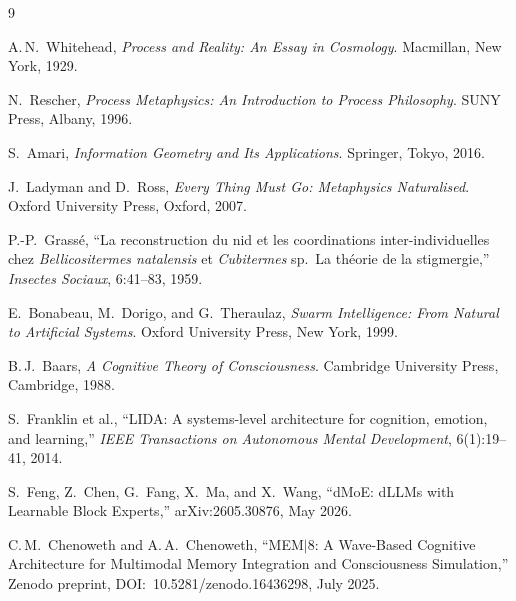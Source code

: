 \documentclass[12pt, a4paper, twoside]{article}
\theoremstyle{plain}
\theoremstyle{definition}
\theoremstyle{remark}
\begin{document}
\newpage
\begin{thebibliography}{9}

A.\,N.\ Whitehead, \emph{Process and Reality: An Essay in Cosmology}.
Macmillan, New York, 1929.

N.\ Rescher, \emph{Process Metaphysics: An Introduction to Process Philosophy}.
SUNY Press, Albany, 1996.

S.\ Amari, \emph{Information Geometry and Its Applications}.
Springer, Tokyo, 2016.

J.\ Ladyman and D.\ Ross, \emph{Every Thing Must Go: Metaphysics Naturalised}.
Oxford University Press, Oxford, 2007.

P.-P.\ Grass\'{e}, ``La reconstruction du nid et les coordinations
inter-individuelles chez \emph{Bellicositermes natalensis} et \emph{Cubitermes}
sp.\ La th\'{e}orie de la stigmergie,'' \emph{Insectes Sociaux}, 6:41--83, 1959.

E.\ Bonabeau, M.\ Dorigo, and G.\ Theraulaz, \emph{Swarm Intelligence: From
Natural to Artificial Systems}. Oxford University Press, New York, 1999.

B.\,J.\ Baars, \emph{A Cognitive Theory of Consciousness}.
Cambridge University Press, Cambridge, 1988.

S.\ Franklin et al., ``LIDA: A systems-level architecture for cognition,
emotion, and learning,'' \emph{IEEE Transactions on Autonomous Mental
Development}, 6(1):19--41, 2014.

S.\ Feng, Z.\ Chen, G.\ Fang, X.\ Ma, and X.\ Wang, ``dMoE: dLLMs with
Learnable Block Experts,'' arXiv:2605.30876, May 2026.

C.\,M.\ Chenoweth and A.\,A.\ Chenoweth, ``MEM$|$8: A Wave-Based Cognitive
Architecture for Multimodal Memory Integration and Consciousness Simulation,''
Zenodo preprint, DOI:~10.5281/zenodo.16436298, July 2025.

\end{thebibliography}
\end{document}
